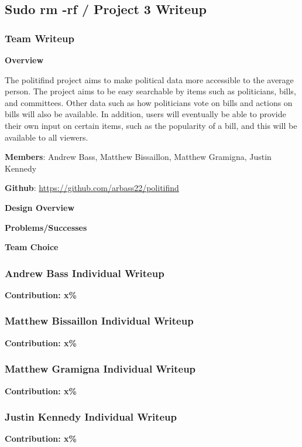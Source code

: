 \documentclass{article}
\newcommand{\n}{\noindent}
\begin{document}
\begin{center}
\subsection*{Sudo rm -rf / Project 3 Writeup}
\end{center}

\subsubsection*{Team Writeup}

\textbf{Overview}

The politifind project aims to make political data more accessible to the average person. The project aims to be easy searchable by items such as politicians, bills, and committees. Other data such as how politicians vote on bills and actions on bills will also be available. In addition, users will eventually be able to provide their own input on certain items, such as the popularity of a bill, and this will be available to all viewers.

\n\textbf{Members}: Andrew Bass, Matthew Bissaillon, Matthew Gramigna, Justin Kennedy

\n\textbf{Github}: \url{https://github.com/arbass22/politifind}

\n\textbf{Design Overview}

\n\textbf{Problems/Successes}

\n\textbf{Team Choice}

\pagebreak

\subsubsection*{Andrew Bass Individual Writeup}

\n\textbf{Contribution: x\%}

\pagebreak

\subsubsection*{Matthew Bissaillon Individual Writeup}

\n\textbf{Contribution: x\%}
\pagebreak

\subsubsection*{Matthew Gramigna Individual Writeup}

\n\textbf{Contribution: x\%}

\pagebreak

\subsubsection*{Justin Kennedy Individual Writeup}

\n\textbf{Contribution: x\%}
\end{document}
